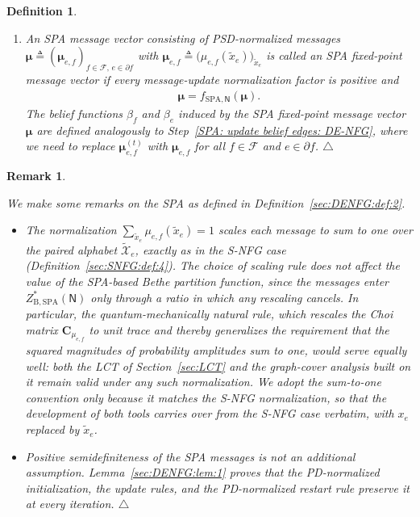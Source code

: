 \documentclass[journal]{IEEEtran}
\newcommand{\add}[1]{{\color{black}#1}}
\newtheorem{remark}[theorem]{Remark}
\newtheorem{definition}[theorem]{Definition}
\newcommand{\manualendsymbol}[1]{%
  \leavevmode\unskip\penalty9999\hbox{}\nobreak\hfill
  \quad\hbox{#1}}
\newcommand{\edefinition}{\manualendsymbol{\ensuremath{\triangle}}}
\newcommand{\eremark}{\manualendsymbol{\ensuremath{\triangle}}}
\newcommand{\vect}[1]{ \bm{#1} }
\newcommand{\beli}{\beta}
\newcommand{\setF}{ \mathcal{F} }
\newcommand{\setpf}{ \partial f }
\newcommand{\xe}{ x_{e} }
\newcommand{\vmu}{ \vect{ \mu } }
\newcommand{\graphN}{ \mathsf{N} }
\newcommand{\defeq}{ \triangleq }
\newcommand{\etof}{ e,f }
\newcommand{\fSPAN}{ f_{\mathrm{SPA},\mathsf{N}} }
\newcommand{\ZBSPA}{ Z_{\mathrm{B,SPA}} }
\newcommand{\tset}[1]{\tilde{\mathcal{#1}}}
\newcommand{\matr}[1]{\vect{#1}}
\newcommand{\ef}{ e,f }
\newcommand{\txe}{ \tilde{x}_{e} }
\begin{document}
\begin{definition}
\begin{enumerate}
    \item An SPA message vector \add{consisting of PSD-normalized
            messages}
          $ \vmu \defeq ( \vmu_{\etof} )_{f \in \setF,\,e \in \setpf} $ with
          $ \vmu_{\etof} \defeq \bigl( \mu_{\etof}(\txe) \bigr)_{ \! \txe } $
          is called an SPA fixed-point message vector if \add{every
            message-update normalization factor is positive and}
          \begin{align}
            \vmu = \fSPAN(\vmu).  \label{sec:DENFG:eqn:15}
          \end{align}
          \add{The belief functions} $ \beli_f $ and $ \beli_e $ \add{induced
            by} the SPA fixed-point message vector $ \vmu $ \add{are defined
            analogously to Step~\ref{SPA: update belief edges: DE-NFG}}, where
          we need to replace $ \vmu_{\etof}^{(t)} $ with $ \vmu_{\etof} $ for
          all $ f \in \setF $ and $ e \in \setpf $.\edefinition

  \end{enumerate}
\end{definition}

\begin{remark}
  \label{asmp: assume messages are PSD}

  We make some remarks on the SPA as defined in
  Definition~\ref{sec:DENFG:def:2}.
  \begin{itemize}
    \item \add{The normalization $\sum_{\txe}\mu_{\ef}(\txe)=1$ scales each
            message to sum to one over the paired alphabet $\tset{X}_e$, exactly as
            in the S-NFG case (Definition~\ref{sec:SNFG:def:4}). The choice of
            scaling rule does not affect the value of the SPA-based Bethe partition
            function, since the messages enter $\ZBSPA^{*}(\graphN)$ only through a
            ratio in which any rescaling cancels. In particular, the
            quantum-mechanically natural rule, which rescales the Choi matrix
            $\matr{C}_{\mu_{\ef}}$ to unit trace and thereby generalizes the
            requirement that the squared magnitudes of probability amplitudes sum to
            one, would serve equally well: both the LCT of Section~\ref{sec:LCT} and
            the graph-cover analysis built on it remain valid under any such
            normalization. We adopt the sum-to-one convention only because it
            matches the S-NFG normalization, so that the development of both tools
            carries over from the S-NFG case verbatim, with $\xe$ replaced by
            $\txe$.}

    \item \add{Positive semidefiniteness of the SPA messages is not an
            additional assumption. Lemma~\ref{sec:DENFG:lem:1} proves that the
            PD-normalized initialization, the update rules, and the PD-normalized
            restart rule preserve it at every iteration.}\eremark
  \end{itemize}

\end{remark}
\end{document}
